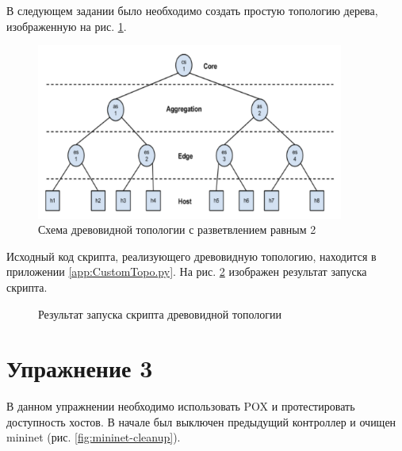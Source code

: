 \documentclass[a4paper, 14pt]{extarticle}
\begin{document}
В следующем задании было необходимо создать простую топологию дерева,
изображенную на рис. \ref{fig:tree-topology}.

\begin{figure}[H]
  \centering
  \includegraphics[width=0.9\textwidth]{images/tree-topology.png}
  \caption{Схема древовидной топологии с разветвлением равным 2}
  \label{fig:tree-topology}
\end{figure}

Исходный код скрипта, реализующего древовидную топологию, находится в приложении
\ref{app:CustomTopo.py}. На рис. \ref{fig:tree-py} изображен результат запуска
скрипта.

\begin{figure}[H]
  \centering
  \caption{Результат запуска скрипта древовидной топологии}
  \label{fig:tree-py}
\end{figure}

\section*{Упражнение 3}

В данном упражнении необходимо использовать POX и протестировать доступность
хостов. В начале был выключен предыдущий контроллер и очищен mininet (рис.
\ref{fig:mininet-cleanup}).
\end{document}
